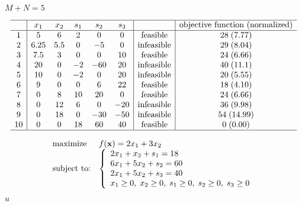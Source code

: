 \documentclass{article}
\def\lthtmlcheckvsize{\ifdim\ht\sizebox<\vsize 
  \ifdim\wd\sizebox<\hsize\expandafter\hfill\fi \expandafter\vfill
  \else\expandafter\vss\fi}%
\begin{document}
{\newpage\clearpage
{}%
$ M+N=5$%
\lthtmlindisplaymathZ
\lthtmlcheckvsize\clearpage}

{\newpage\clearpage
{}%
\begin{displaymath}\begin{array}{c|ccccc|c|c}\hline
& x_1 & x_2 & s_1 & s_2 & s_3 & & \mbox{objective function (normalized)} \\\hline
1 & 5 & 6 & 2 & 0 & 0 & \mbox{feasible}   & 28\; (7.77) \\
2 &6.25 & 5.5 & 0 & -5 & 0 & \mbox{infeasible} & 29\; (8.04) \\
3 & 7.5 & 3 & 0 & 0 & 10 & \mbox{feasible}   & 24\; (6.66) \\
4 &20 & 0 & -2 & -60 & 20  & \mbox{infeasible} & 40\; (11.1) \\
5 &10 & 0 & -2 & 0 & 20 & \mbox{infeasible} & 20\; (5.55) \\
6 & 9 & 0 & 0 & 6 & 22 & \mbox{feasible}   & 18\; (4.10) \\
7 & 0 & 8 & 10 & 20 & 0 & \mbox{feasible}   & 24\; (6.66) \\
8 & 0 & 12 & 6 & 0 & -20 & \mbox{infeasible} & 36\; (9.98) \\
9 & 0 & 18 & 0 & -30 & -50 & \mbox{infeasible} & 54\; (14.99) \\
10& 0 & 0 & 18 & 60 & 40 & \mbox{feasible}   &  0\; (0.00) \\\hline
\end{array}\end{displaymath}%
\lthtmldisplayZ
\lthtmlcheckvsize\clearpage}

{\newpage\clearpage
{}%
\begin{displaymath}\begin{array}{ll}
\mbox{maximize}    & f({\bf x})=2x_1+3x_2 \\
\mbox{subject to:} &
\left\{ \begin{array}{l}
2x_1+ x_2+s_1=18\\6x_1+5x_2+s_2=60 \\2x_1+5x_2+s_3=40 \\
x_1 \ge 0,\; x_2\ge 0,\; s_1\ge 0,\; s_2\ge 0,\; s_3\ge0
\end{array}\right.
\end{array}\end{displaymath}%
\lthtmldisplayZ
\lthtmlcheckvsize\clearpage}

{\newpage\clearpage
{}%
$ u$%
\lthtmlindisplaymathZ
\lthtmlcheckvsize\clearpage}
\end{document}
